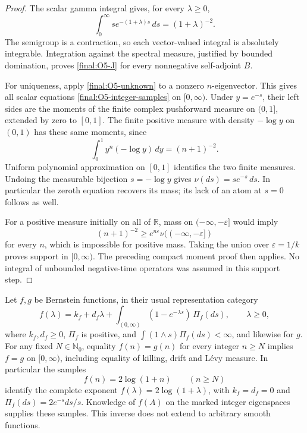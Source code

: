 \begin{proof}
The scalar gamma integral gives, for every $\lambda\geq0$,
\[
 \int_0^\infty se^{-(1+\lambda)s}\,ds=(1+\lambda)^{-2}.
\]
The semigroup is a contraction, so each vector-valued integral is
absolutely integrable.  Integration against the spectral measure,
justified by bounded domination, proves
\eqref{final:O5-J} for every nonnegative self-adjoint $B$.

For uniqueness, apply \eqref{final:O5-unknown} to a nonzero
$n$-eigenvector.  This gives all scalar equations
\eqref{final:O5-integer-samples} on $[0,\infty)$.
Under $y=e^{-s}$, their left sides are the moments of the finite
complex pushforward measure on $(0,1]$, extended by zero to $[0,1]$.
The finite positive measure with density $-\log y$ on $(0,1)$ has
these same moments, since
\[
 \int_0^1y^n(-\log y)\,dy=(n+1)^{-2}.
\]
Uniform polynomial approximation on $[0,1]$ identifies the two
finite measures.  Undoing the measurable bijection $s=-\log y$
gives $\nu(ds)=se^{-s}\,ds$.  In particular the zeroth equation
recovers its mass; its lack of an atom at $s=0$ follows as well.

For a positive measure initially on all of $\mathbb R$, mass on
$(-\infty,-\varepsilon]$ would imply
\[
 (n+1)^{-2}\geq e^{n\varepsilon}
       \nu(( -\infty,-\varepsilon])
\]
for every $n$, which is impossible for positive mass.  Taking the
union over $\varepsilon=1/k$ proves support in $[0,\infty)$.
The preceding compact moment proof then applies.  No integral of
unbounded negative-time operators was assumed in this support step.
\end{proof}

\begin{theorem}
\label{final:O6}
Let $f,g$ be Bernstein functions, in their usual representation
category
\begin{equation}\label{final:O6-bernstein-representation}
 f(\lambda)=k_f+d_f\lambda+
   \int_{(0,\infty)}(1-e^{-\lambda s})\,\Pi_f(ds),
 \qquad \lambda\geq0,
\end{equation}
where $k_f,d_f\geq0$, $\Pi_f$ is positive, and
$\int(1\wedge s)\Pi_f(ds)<\infty$, and likewise for $g$.
For any fixed $N\in\mathbb N_0$, equality $f(n)=g(n)$ for every
integer $n\geq N$ implies $f=g$ on $[0,\infty)$, including equality
of killing, drift and L\'evy measure.
In particular the samples
\[
 f(n)=2\log(1+n)\qquad(n\geq N)
\]
identify the complete exponent $f(\lambda)=2\log(1+\lambda)$,
with $k_f=d_f=0$ and $\Pi_f(ds)=2e^{-s}ds/s$.
Knowledge of $f(A)$ on the marked integer eigenspaces supplies these
samples.  This inverse does not extend to arbitrary smooth functions.
\end{theorem}

